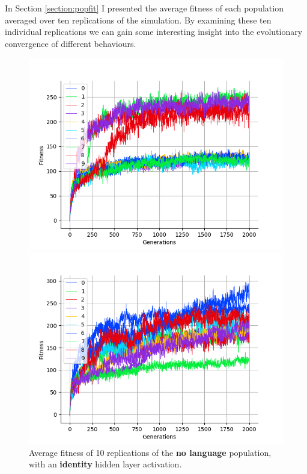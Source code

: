 \documentclass[12pt,a4paper,twoside,openright]{report}
\begin{document}

In Section \ref{section:popfit} I presented the average fitness of each population averaged over ten replications of the simulation. By examining these ten individual replications we can gain some interesting insight into the evolutionary convergence of different behaviours.

\begin{figure}[t]
   \centering
   \begin{minipage}{0.49\textwidth}
          \centering
          \captionsetup{width=.9\linewidth}
          \includegraphics[width=1.\linewidth]{results/ten-none-identity.png}
          \caption{Average fitness of 10 replications of the {\bf no language} population, with an {\bf identity} hidden layer activation.}
          \label{fig:ten-none-identity}
   \end{minipage}
   \begin{minipage}{0.49\textwidth}
          \centering
          \captionsetup{width=.9\linewidth}
          \includegraphics[width=1.\linewidth]{results/ten-none-relu.png}

\end{minipage}
\end{figure}
\end{document}
